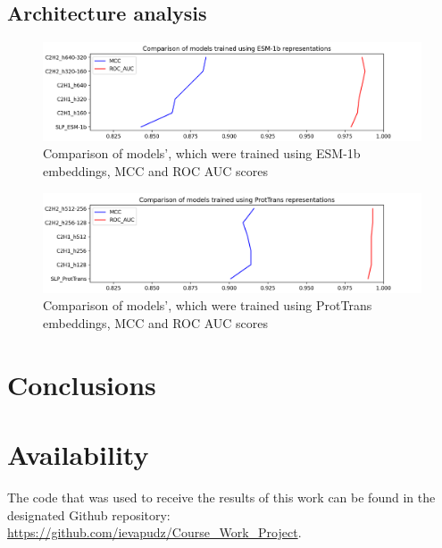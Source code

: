 \documentclass[12pt]{article}
\begin{document}
	\newpage

	\subsection{Architecture analysis}

	\begin{figure}[h!]
		\centering
		\includegraphics[scale=0.6]{MLP_ESM.png}

		\caption{Comparison of models', which were trained using 
		ESM-1b embeddings, MCC and ROC AUC scores}
		\label{figure:scoresMLP_ESM}
	\end{figure}

	\begin{figure}[h!]
		\centering
		\includegraphics[scale=0.6]{MLP_PT.png}

		\caption{Comparison of models', which were trained using 
		ProtTrans embeddings, MCC and ROC AUC scores}
		\label{figure:scoresMLP_PT}
	\end{figure}

	\newpage

	\section{Conclusions}

	\newpage

	\section{Availability}

	The code that was used to receive the results of this work can be found
	in the designated Github repository: 
	\href{https://github.com/ievapudz/Course_Work_Project}{https://github.com/ievapudz/Course\_Work\_Project}.

	\newpage
	
	\nocite{*}
	
	\normalsize

 

\end{document}
